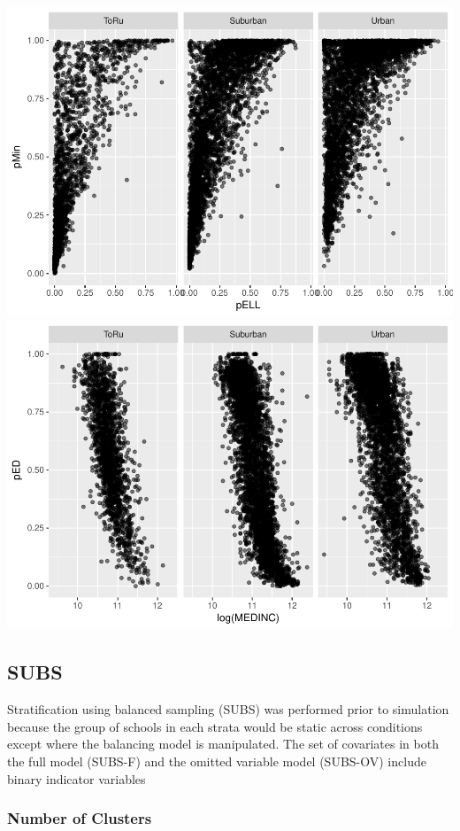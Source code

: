 \documentclass[floatsintext,man]{apa6}
\theoremstyle{definition}
\theoremstyle{definition}
\theoremstyle{definition}
\theoremstyle{remark}
\begin{document}
\includegraphics{Method_files/figure-latex/distributions-4.pdf}
\includegraphics{Method_files/figure-latex/distributions-5.pdf}

\subsection{SUBS}\label{subs}

Stratification using balanced sampling (SUBS) was performed prior to
simulation because the group of schools in each strata would be static
across conditions except where the balancing model is manipulated. The
set of covariates in both the full model (SUBS-F) and the omitted
variable model (SUBS-OV) include binary indicator variables

\subsubsection{Number of Clusters}\label{number-of-clusters}
\end{document}

